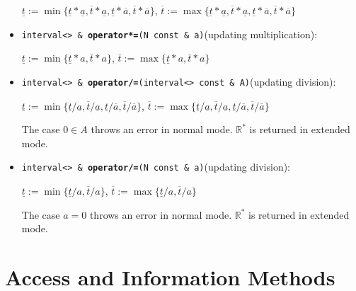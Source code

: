 \documentclass{report}
\newcommand{\Rs}{\mathbb{R}^*}
\begin{document}
\begin{itemize}
			\begin{center}
				$\underline{t} := \min\{\underline{t}*\underline{a},\overline{t}*\underline{a},\underline{t}*\overline{a},\overline{t}*\overline{a}\}$,
				$\overline{t} := \max\{\underline{t}*\underline{a},\overline{t}*\underline{a},\underline{t}*\overline{a},\overline{t}*\overline{a}\}$
			\end{center}
		\item
			\texttt{interval<> \& {\bf operator*=}(N const \&
				a)}(updating multiplication):\\
	
			\begin{center}
				$\underline{t} := \min\{\underline{t}*a,\overline{t}*a\}$,
				$\overline{t}  := \max\{\underline{t}*a,\overline{t}*a\}$
			\end{center}
		\item
			\texttt{interval<> \& {\bf operator/=}(interval<> const \& A)}(updating division):\\
	
			\begin{center}
				$\underline{t} := \min\{\underline{t}/\underline{a},\overline{t}/\underline{a},\underline{t}/\overline{a},\overline{t}/\overline{a}\}$,
				$\overline{t} := \max\{\underline{t}/\underline{a},\overline{t}/\underline{a},\underline{t}/\overline{a},\overline{t}/\overline{a}\}$
			\end{center}
			The case $0\in A$ throws an error in normal
				mode. $\Rs$ is returned in extended mode.
		\item
			\texttt{interval<> \& {\bf operator/=}(N const \& a)}(updating division):\\

			\begin{center}
				$\underline{t} := \min\{\underline{t}/a,\overline{t}/a\}$,
				$\overline{t}  := \max\{\underline{t}/a,\overline{t}/a\}$
			\end{center}
			The case $ a = 0$ throws an error in normal
				mode. $\Rs$ is returned in extended mode.
		\end{itemize}
	\section{Access and Information Methods}
	 
\end{document}
